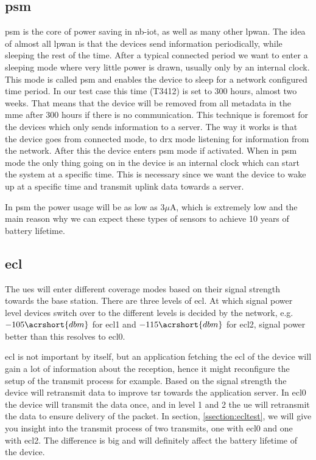 \documentclass[USenglish]{ifimaster}  %
\begin{document}
\subsection[\acrlong{psm}]{\acrfull{psm}} \label{ssection:psm}
\acrshort{psm} is the core of power saving in \acrshort{nb-iot}, as well as many other \acrshort{lpwan}. The idea of almost all \acrshort{lpwan} is that the devices send information periodically, while sleeping the rest of the time. After a typical connected period we want to enter a sleeping mode where very little power is drawn, usually only by an internal clock. This mode is called \acrshort{psm} and enables the device to sleep for a network configured time period. In our test case this time (\acrfull{T3412}) is set to 300 hours, almost two weeks. That means that the device will be removed from all metadata in the \acrshort{mme} after 300 hours if there is no communication. This technique is foremost for the devices which only sends information to a server. The way it works is that the device goes from connected mode, to \acrshort{drx} mode listening for information from the network. After this the device enters \acrshort{psm} mode if activated. When in \acrshort{psm} mode the only thing going on in the device is an internal clock which can start the system at a specific time. This is necessary since we want the device to wake up at a specific time and transmit uplink data towards a server.

In \acrshort{psm} the power usage will be as low as 3$\mu$A, which is extremely low and the main reason why we can expect these types of sensors to achieve 10 years of battery lifetime.

\subsection{\acrlong{ecl}} \label{ssection:ecl}
The \acrshort{ue}s will enter different coverage modes based on their signal strength towards the base station. There are three levels of \acrfull{ecl}. At which signal power level devices switch over to the different levels is decided by the network, e.g. ${-105 \acrshort{dbm}}$ for \acrshort{ecl}1 and ${-115 \acrshort{dbm}}$ for \acrshort{ecl}2, signal power better than this resolves to \acrshort{ecl}0.

\acrshort{ecl} is not important by itself, but an application fetching the \acrshort{ecl} of the device will gain a lot of information about the reception, hence it might reconfigure the setup of the transmit process for example. Based on the signal strength the device will retransmit data to improve \acrfull{tsr} towards the application server. In \acrshort{ecl}0 the device will transmit the data once, and in level 1 and 2 the \acrshort{ue} will retransmit the data to ensure delivery of the packet. In section, \vref{ssection:ecltest}, we will give you insight into the transmit process of two transmits, one with \acrshort{ecl}0 and one with \acrshort{ecl}2. The difference is big and will definitely affect the battery lifetime of the device.
\end{document}
